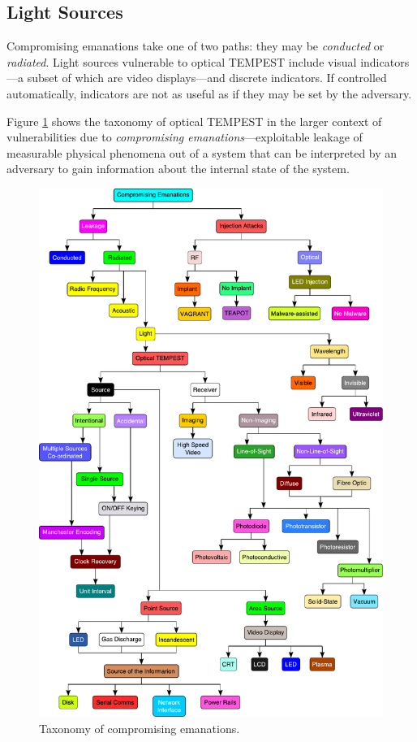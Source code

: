 \documentclass[a4paper,twoside,oldfontcommands]{memoir}
\begin{document}
\subsection{Light Sources}
Compromising emanations take one of two paths: they may be \emph{conducted} or
\emph{radiated}. Light sources vulnerable to optical TEMPEST include visual
indicators---a subset of which are video displays---and discrete indicators. If
controlled automatically, indicators are not as useful as if they may be set by
the adversary.

Figure \ref{figure:taxonomy} shows the taxonomy of optical TEMPEST in the
larger context of vulnerabilities due to \emph{compromising
emanations}---exploitable leakage of measurable physical phenomena out of a
system that can be interpreted by an adversary to gain information about the
internal state of the system.
\begin{figure}[h]
  \centering
  \includegraphics[width=\textwidth]{taxonomy.pdf}
  \caption{Taxonomy of compromising emanations.}
  \label{figure:taxonomy}
\end{figure}
\end{document}
